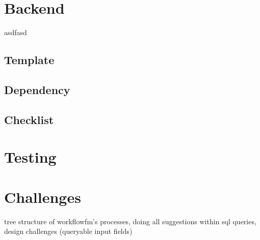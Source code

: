\section{Backend}

asdfasd






\subsection{Template}

\subsection{Dependency}
\label{backend_dependency}

\subsection{Checklist}


\section{Testing}


\section{Challenges}

tree structure of workflowfm's processes, doing all suggestions within sql queries, design challenges (queryable input fields)
